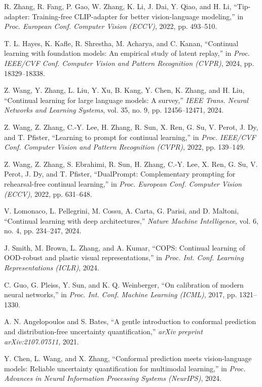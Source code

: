 \documentclass[conference]{IEEEtran}
\begin{document}
\begin{thebibliography}{99}
R. Zhang, R. Fang, P. Gao, W. Zhang, K. Li, J. Dai, Y. Qiao, and H. Li, ``Tip-adapter: Training-free CLIP-adapter for better vision-language modeling,'' in \textit{Proc. European Conf. Computer Vision (ECCV)}, 2022, pp. 493--510.

T. L. Hayes, K. Kafle, R. Shrestha, M. Acharya, and C. Kanan, ``Continual learning with foundation models: An empirical study of latent replay,'' in \textit{Proc. IEEE/CVF Conf. Computer Vision and Pattern Recognition (CVPR)}, 2024, pp. 18329--18338.

Z. Wang, Y. Zhang, L. Liu, Y. Xu, B. Kang, Y. Chen, K. Zhang, and H. Liu, ``Continual learning for large language models: A survey,'' \textit{IEEE Trans. Neural Networks and Learning Systems}, vol. 35, no. 9, pp. 12456--12471, 2024.

Z. Wang, Z. Zhang, C.-Y. Lee, H. Zhang, R. Sun, X. Ren, G. Su, V. Perot, J. Dy, and T. Pfister, ``Learning to prompt for continual learning,'' in \textit{Proc. IEEE/CVF Conf. Computer Vision and Pattern Recognition (CVPR)}, 2022, pp. 139--149.

Z. Wang, Z. Zhang, S. Ebrahimi, R. Sun, H. Zhang, C.-Y. Lee, X. Ren, G. Su, V. Perot, J. Dy, and T. Pfister, ``DualPrompt: Complementary prompting for rehearsal-free continual learning,'' in \textit{Proc. European Conf. Computer Vision (ECCV)}, 2022, pp. 631--648.

V. Lomonaco, L. Pellegrini, M. Cossu, A. Carta, G. Parisi, and D. Maltoni, ``Continual learning with deep architectures,'' \textit{Nature Machine Intelligence}, vol. 6, no. 4, pp. 234--247, 2024.

J. Smith, M. Brown, L. Zhang, and A. Kumar, ``COPS: Continual learning of OOD-robust and plastic visual representations,'' in \textit{Proc. Int. Conf. Learning Representations (ICLR)}, 2024.

C. Guo, G. Pleiss, Y. Sun, and K. Q. Weinberger, ``On calibration of modern neural networks,'' in \textit{Proc. Int. Conf. Machine Learning (ICML)}, 2017, pp. 1321--1330.

A. N. Angelopoulos and S. Bates, ``A gentle introduction to conformal prediction and distribution-free uncertainty quantification,'' \textit{arXiv preprint arXiv:2107.07511}, 2021.

Y. Chen, L. Wang, and X. Zhang, ``Conformal prediction meets vision-language models: Reliable uncertainty quantification for multimodal learning,'' in \textit{Proc. Advances in Neural Information Processing Systems (NeurIPS)}, 2024.


\end{thebibliography}
\end{document}
